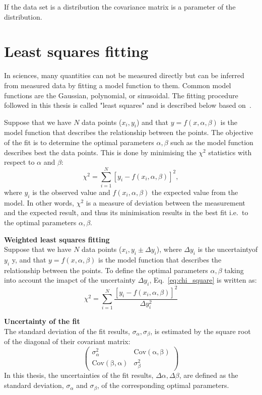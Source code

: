If the data set is a distribution the covariance matrix is a parameter of the distribution.


\section{Least squares fitting}\label{app:non_linear_fitting}
In sciences, many quantities can not be measured directly but can be inferred from measured data by fitting a model function to them. Common model functions are the Gaussian, polynomial, or sinusoidal. The fitting procedure followed in this thesis is called "least squares" and is described below based on~\cite{least_square_minimisation}.

Suppose that we have $N$ data points ($x_{i}, y_{i}$) and that $y=f(x,\alpha, \beta)$ is the model function that describes the relationship between the points. The objective of the fit is to determine the optimal parameters $\alpha, \beta$ such as the model function describes best the data points. This is done by minimising the $\chi^2$ statistics with respect to $\alpha$ and $\beta$:
\begin{equation}\label{eq:chi_square}
    \chi^2 = \sum_{i=1}^{N}[y_{i}-f(x_{i},\alpha, \beta)]^2,
\end{equation}
where $y_{i}$ is the observed value and $f(x_{i},\alpha, \beta)$ the expected value from the model. In other words, $\chi^2$ is a measure of deviation between the measurement and the expected result, and thus its minimisation results in the best fit i.e.\ to the optimal parameters $\alpha, \beta$.

\normalsize{\textbf{Weighted least squares fitting}}\\
Suppose that we have $N$ data points ($x_i, y_i \pm \Delta y_i $), where $ \Delta y_i$ is the uncertaintyof $y_i$ y, and that $y=f(x,\alpha, \beta)$ is the model function that describes the relationship between the points. To define the optimal parameters $\alpha, \beta$ taking into account the imapct of the uncertainty $\Delta y_i$, Eq.~\eqref{eq:chi_square} is written as:
\begin{equation}\label{eq:chi_square_weights}
    \chi^2 = \sum_{i=1}^{N}\frac{[y_{i}-f(x_{i},\alpha, \beta)]^2}{\Delta y_i^2}
\end{equation}

\normalsize{\textbf{Uncertainty of the fit}}\\
The standard deviation of the fit results, $\sigma_\alpha, \sigma_\beta$, is estimated by the square root of the diagonal of their covariant matrix:
\begin{equation}\label{eq:cov_matrix_fit_results}
    \begin{pmatrix}
        \sigma_{\alpha}^2 & \mathrm{Cov(\alpha, \beta)}\\
        \mathrm{Cov(\beta, \alpha)} & \sigma_{\beta}^2
        \end{pmatrix}
\end{equation}
In this thesis, the uncertainties of the fit results, $\Delta \alpha, \Delta \beta$, are defined as the standard deviation, $\sigma_{\alpha}$ and  $\sigma_{\beta}$, of the corresponding optimal parameters.

